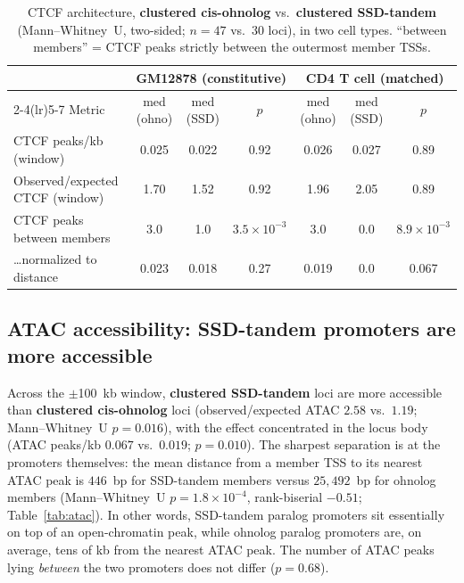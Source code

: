 \documentclass[11pt]{article}
\newcommand{\ohno}{\textcolor{ohno}{\textbf{clustered cis-ohnolog}}}
\newcommand{\ssd}{\textcolor{ssd}{\textbf{clustered SSD-tandem}}}
\begin{document}
\begin{table}[H]
\centering
\caption{CTCF architecture, \ohno{} vs.\ \ssd{} (Mann--Whitney~U, two-sided; $n=47$ vs.\ $30$ loci),
in two cell types. ``between members'' = CTCF peaks strictly between the outermost member TSSs.}
\label{tab:ctcf}
\small
\begin{tabular}{lcccccc}
\toprule
& \multicolumn{3}{c}{GM12878 (constitutive)} & \multicolumn{3}{c}{CD4 T cell (matched)} \\
\cmidrule(lr){2-4}\cmidrule(lr){5-7}
Metric & med (ohno) & med (SSD) & $p$ & med (ohno) & med (SSD) & $p$ \\
\midrule
CTCF peaks/kb (window)          & 0.025 & 0.022 & 0.92  & 0.026 & 0.027 & 0.89 \\
Observed/expected CTCF (window) & 1.70  & 1.52  & 0.92  & 1.96  & 2.05  & 0.89 \\
CTCF peaks between members      & 3.0   & 1.0   & $3.5\times10^{-3}$ & 3.0 & 0.0 & $8.9\times10^{-3}$ \\
\ldots normalized to distance   & 0.023 & 0.018 & 0.27  & 0.019 & 0.0   & 0.067 \\
\bottomrule
\end{tabular}
\end{table}

\subsection{ATAC accessibility: SSD-tandem promoters are more accessible}
Across the $\pm$100~kb window, \ssd{} loci are more accessible than \ohno{} loci
(observed/expected ATAC $2.58$ vs.\ $1.19$; Mann--Whitney~U $p=0.016$), with the effect
concentrated in the locus body (ATAC peaks/kb $0.067$ vs.\ $0.019$; $p=0.010$). The sharpest
separation is at the promoters themselves: the mean distance from a member TSS to its nearest ATAC
peak is $446$~bp for SSD-tandem members versus $25{,}492$~bp for ohnolog members
(Mann--Whitney~U $p=1.8\times10^{-4}$, rank-biserial $-0.51$; Table~\ref{tab:atac}). In other words,
SSD-tandem paralog promoters sit essentially on top of an open-chromatin peak, while ohnolog
paralog promoters are, on average, tens of kb from the nearest ATAC peak. The number of ATAC peaks
lying \emph{between} the two promoters does not differ ($p=0.68$).
\end{document}
